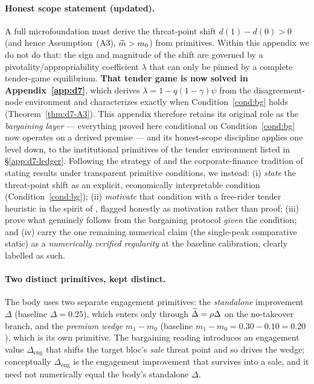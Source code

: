 \documentclass[11pt]{article}
\newcommand{\1}{\mathbf{1}}
\begin{document}
\paragraph{Honest scope statement (updated).}
A full microfoundation must derive the threat-point shift $d(1)-d(0)>0$ (and hence Assumption~\textup{(A3)}, $\widetilde{m}>m_{0}$) from primitives. Within this appendix we do not do that: the sign and magnitude of the shift are governed by a pivotality/appropriability coefficient $\lambda$ that can only be pinned by a complete tender-game equilibrium. \textbf{That tender game is now solved in Appendix~\ref{app:d7}}, which derives $\lambda=1-q(1-\gamma)\psi$ from the disagreement-node environment and characterizes exactly when Condition~\ref{cond:bg} holds (Theorem~\ref{thm:d7-A3}). This appendix therefore retains its original role as the \emph{bargaining layer} --- everything proved here conditional on Condition~\ref{cond:bg} now operates on a derived premise --- and its honest-scope discipline applies one level down, to the institutional primitives of the tender environment listed in \S\ref{app:d7-ledger}. Following the strategy of \citet{EdmansGoldsteinJiang2015} and the corporate-finance tradition of stating results under transparent primitive conditions, we instead: (i) \emph{state} the threat-point shift as an explicit, economically interpretable condition (Condition~\ref{cond:bg}); (ii) \emph{motivate} that condition with a free-rider tender heuristic in the spirit of \citet{GrossmanHart1980}, flagged honestly as motivation rather than proof; (iii) prove what genuinely follows from the bargaining protocol \emph{given} the condition; and (iv) carry the one remaining numerical claim (the single-peak comparative static) as a \emph{numerically verified regularity} at the baseline calibration, clearly labelled as such.

\paragraph{Two distinct primitives, kept distinct.}
The body uses two separate engagement primitives: the \emph{standalone} improvement $\Delta$ (baseline $\Delta=0.25$), which enters only through $\widetilde{\Delta}=\rho\Delta$ on the no-takeover branch, and the \emph{premium wedge} $m_{1}-m_{0}$ (baseline $m_{1}-m_{0}=0.30-0.10=0.20$), which is its own primitive. The bargaining reading introduces an engagement value $\Delta_{\mathrm{eng}}$ that shifts the target bloc's \emph{sale} threat point and so drives the wedge; conceptually $\Delta_{\mathrm{eng}}$ is the engagement improvement that survives into a sale, and it need not numerically equal the body's standalone $\Delta$.
\end{document}

